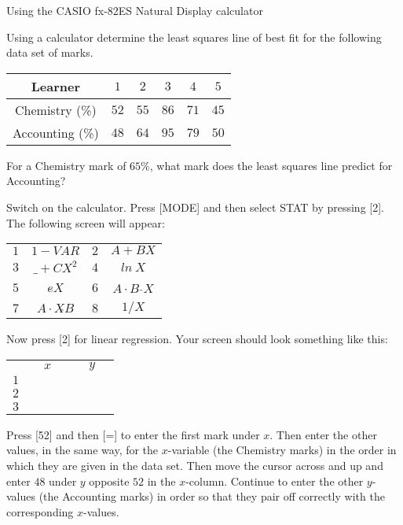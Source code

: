 \begin{wex}{Using the CASIO fx-82ES Natural Display calculator
}{%
Using a calculator determine the least squares line of best fit for the following data set of marks.

\begin{tabular}{|c|c|c|c|c|c|}
\hline
Learner & $1$ & $2$ & $3$ & $4$ & $5$ \\ \hline
Chemistry (\%) & $52$ & $55$ & $86$ & $71$ & $45$ \\ \hline
Accounting (\%) & $48$ & $64$ & $95$ & $79$ & $50$ \\ \hline
\end{tabular}

For a Chemistry mark of $65\%$, what mark does the least squares line predict for Accounting?
}{%
Switch on the calculator. Press [MODE] and then select STAT by pressing [2]. The following screen will appear:
\begin{center}
\begin{tabular}{|c c c c|}\hline
$1$ & $1-VAR$ & $2$ & $A + BX$ \\
$3$ & $\_ + CX^2$ & $4$ & $ln~X$ \\
$5$ & $e \hat{ } X$ & $6$ & $A \cdot B$ $\hat{ } X$ \\
$7$ & $A \cdot X \hat{ } B$ & $8$ & $1/X$ \\\hline
\end{tabular}
\end{center}
Now press [2] for linear regression. Your screen should look something like this:
\begin{center}
\begin{tabular}{c|c c c|c c c}
 & & $x$ & & & $y$ &\\
$1$& & & & & & \\
$2$& & & & & & \\
$3$& & & & & & \\
\end{tabular}
\end{center}

Press [52] and then [=] to enter the first mark under $x$. Then enter the other values, in the same way, for the $x$-variable (the Chemistry marks) in the order in which they are given in the data set. Then move the cursor across and up and enter $48$ under $y$ opposite $52$ in the $x$-column. Continue to enter the other $y$-values (the Accounting marks) in order so that they pair off correctly with the corresponding $x$-values.

}
\end{wex}
